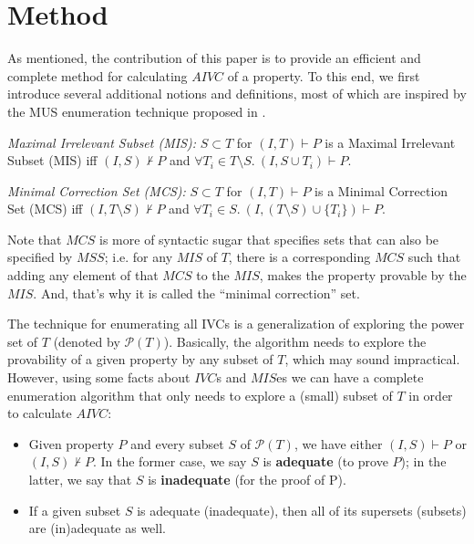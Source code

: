 \section{Method}
\label{sec:allivcs}
 
\newcommand{\ucalg}{IVC\_UC\xspace}  

\newcommand{\mink}{\textsc{MinimizeK}\xspace}
\newcommand{\reduceinv}{\textsc{ReduceInvariants}\xspace}
\newcommand{\minivc}{\textsc{MinimizeIvc}\xspace}

\newcommand{\checksat}{\textsc{CheckSat}\xspace}
\newcommand{\unsatcore}{\textsc{UnsatCore}\xspace}
\newcommand{\unsat}{\textsc{UNSAT}\xspace}
\newcommand{\sat}{\textsc{SAT}\xspace}

As mentioned, the contribution of this paper is to provide an efficient and complete method for calculating $AIVC$ of a property. To this end, we first introduce several additional notions and definitions, most of which are inspired by the MUS enumeration technique proposed in \cite{marco2016fast}.

\begin{definition}{\emph{Maximal Irrelevant Subset (MIS):}}
  \label{def:mis}
  $S \subset T$ for $(I, T) \vdash P$ is a Maximal Irrelevant Subset (MIS) iff 
  $(I, S) \nvdash P$ and $\forall T_i \in T\setminus S.~ (I, S\cup{T_i}) \vdash P$.  
\end{definition}

\begin{definition}{\emph{Minimal Correction Set (MCS):}}
  \label{def:mcs}
  $S \subset T$ for $(I, T) \vdash P$ is a Minimal Correction Set (MCS) iff
  $(I, T \setminus S) \nvdash P$ and $\forall T_i \in S.~ (I, (T \setminus S)\cup \{T_i\}) \vdash P$.
\end{definition}

Note that $MCS$ is more of syntactic sugar that specifies sets that can also be specified by $MSS$; i.e. for any $MIS$ of $T$, there is a corresponding $MCS$ such that adding any element of that $MCS$ to the $MIS$, makes the property provable by the $MIS$. 
And, that's why it is called the ``minimal correction'' set. 

The technique for enumerating all IVCs is a generalization of exploring the power set of $T$ (denoted by $ \mathcal{P}(T) $).
Basically, the algorithm needs to explore the provability of a 
given property by any subset of $T$, which may sound impractical. 
However, using some facts about $IVC$s and $MIS$es we can have a complete
enumeration algorithm that only needs to explore a (small) subset of $T$ 
in order to calculate $AIVC$:
\begin{itemize}
  \item Given property $P$ and every subset $S$ of $\mathcal{P}(T)$, we have either $(I, S) \vdash P$ or $(I, S) \nvdash P$. In the former case, we say $S$ is \textbf{adequate} (to prove $P$); in the latter, we say that $S$ is \textbf{inadequate} (for the proof of P).
  \item If a given subset $S$ is adequate (inadequate), then all of its supersets (subsets) are (in)adequate as well. 
\end{itemize}

